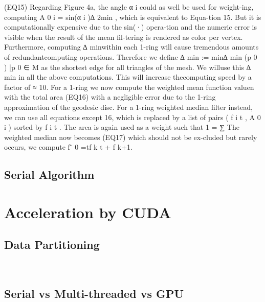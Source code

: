\documentclass{article}
\begin{document}
(EQ15)
Regarding Figure 4a, the angle α i could as well be used for weight-ing, computing A 0 i = sin(α i )∆ 2min , which is equivalent to Equa-tion 15. But it is computationally expensive due to the sin(·) opera-tion and the numeric error is visible when the result of the mean fil-tering is rendered as color per vertex. Furthermore, computing ∆ minwithin each 1-ring will cause tremendous amounts of redundantcomputing operations. Therefore we define ∆ min := min{∆ min (p 0 ) |p 0 ∈ M} as the shortest edge for all triangles of the mesh. We willuse this ∆ min in all the above computations. This will increase thecomputing speed by a factor of ≈ 10. For a 1-ring we now compute the weighted mean function valuen with the total area 
(EQ16)
with a negligible error due to the 1-ring approximation of the geodesic disc. For a 1-ring weighted median filter instead, we can use all equations except 16, which is replaced by a list of pairs ( f i t , A 0 i ) sorted by f i t . The area is again used as a weight such that 1 = ∑ The weighted median now becomes
(EQ17)
which should not be ex-cluded but rarely occurs, we compute f  ̃ 0 =tf k t + f k+1.
\subsection{Serial Algorithm}
\section{Acceleration by CUDA}
\subsection{Data Partitioning}~\cite[p.~357]{Lang17}
\subsection{Serial vs Multi-threaded vs GPU}
\end{document}
